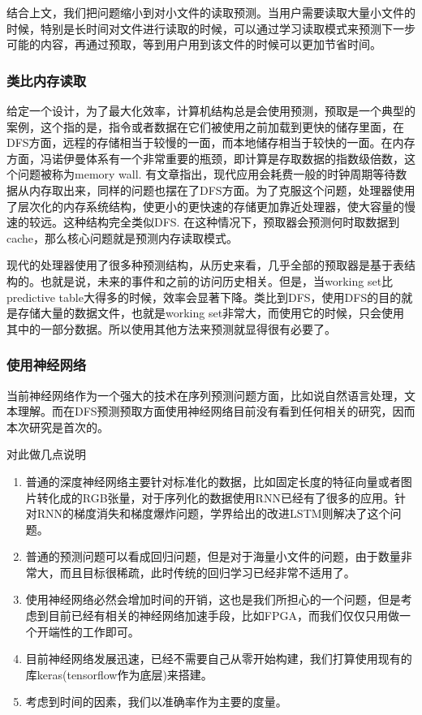 \documentclass[UTF8]{ctexart}
\begin{document}
结合上文，我们把问题缩小到对小文件的读取预测。当用户需要读取大量小文件的时候，特别是长时间对文件进行读取的时候，可以通过学习读取模式来预测下一步可能的内容，再通过预取，等到用户用到该文件的时候可以更加节省时间。

\subsubsection{类比内存读取}
给定一个设计，为了最大化效率，计算机结构总是会使用预测，预取是一个典型的案例，这个指的是，指令或者数据在它们被使用之前加载到更快的储存里面，在DFS方面，远程的存储相当于较慢的一面，而本地储存相当于较快的一面。在内存方面，冯诺伊曼体系有一个非常重要的瓶颈，即计算是存取数据的指数级倍数，这个问题被称为memory wall. 有文章指出，现代应用会耗费一般的时钟周期等待数据从内存取出来，同样的问题也摆在了DFS方面。为了克服这个问题，处理器使用了层次化的内存系统结构，使更小的更快速的存储更加靠近处理器，使大容量的慢速的较远。这种结构完全类似DFS. 在这种情况下，预取器会预测何时取数据到cache，那么核心问题就是预测内存读取模式。

现代的处理器使用了很多种预测结构，从历史来看，几乎全部的预取器是基于表结构的。也就是说，未来的事件和之前的访问历史相关。但是，当working set比predictive table大得多的时候，效率会显著下降。类比到DFS，使用DFS的目的就是存储大量的数据文件，也就是working set非常大，而使用它的时候，只会使用其中的一部分数据。所以使用其他方法来预测就显得很有必要了。

\subsubsection{使用神经网络}
当前神经网络作为一个强大的技术在序列预测问题方面，比如说自然语言处理，文本理解。而在DFS预测预取方面使用神经网络目前没有看到任何相关的研究，因而本次研究是首次的。

对此做几点说明
\begin{enumerate}
\item 普通的深度神经网络主要针对标准化的数据，比如固定长度的特征向量或者图片转化成的RGB张量，对于序列化的数据使用RNN已经有了很多的应用。针对RNN的梯度消失和梯度爆炸问题，学界给出的改进LSTM则解决了这个问题。
\item 普通的预测问题可以看成回归问题，但是对于海量小文件的问题，由于数量非常大，而且目标很稀疏，此时传统的回归学习已经非常不适用了。
\item 使用神经网络必然会增加时间的开销，这也是我们所担心的一个问题，但是考虑到目前已经有相关的神经网络加速手段，比如FPGA，而我们仅仅只用做一个开端性的工作即可。
\item 目前神经网络发展迅速，已经不需要自己从零开始构建，我们打算使用现有的库keras(tensorflow作为底层)来搭建。
\item 考虑到时间的因素，我们以准确率作为主要的度量。
\end{enumerate}
\end{document}
